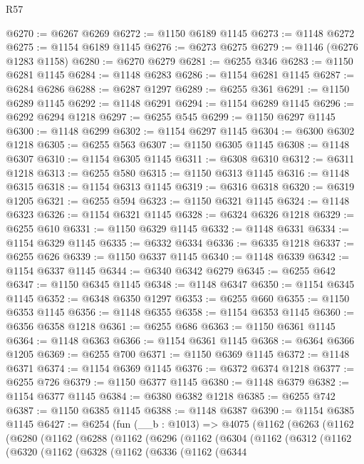 \begin{lexlean}{R57}
\begin{coremodule}
@6270 := @6267 @6269
@6272 := @1150 @6189 @1145
@6273 := @1148 @6272
@6275 := @1154 @6189 @1145
@6276 := @6273 @6275
@6279 := @1146 (@6276 @1283 @1158)
@6280 := @6270 @6279
@6281 := @6255 @346
@6283 := @1150 @6281 @1145
@6284 := @1148 @6283
@6286 := @1154 @6281 @1145
@6287 := @6284 @6286
@6288 := @6287 @1297
@6289 := @6255 @361
@6291 := @1150 @6289 @1145
@6292 := @1148 @6291
@6294 := @1154 @6289 @1145
@6296 := @6292 @6294 @1218
@6297 := @6255 @545
@6299 := @1150 @6297 @1145
@6300 := @1148 @6299
@6302 := @1154 @6297 @1145
@6304 := @6300 @6302 @1218
@6305 := @6255 @563
@6307 := @1150 @6305 @1145
@6308 := @1148 @6307
@6310 := @1154 @6305 @1145
@6311 := @6308 @6310
@6312 := @6311 @1218
@6313 := @6255 @580
@6315 := @1150 @6313 @1145
@6316 := @1148 @6315
@6318 := @1154 @6313 @1145
@6319 := @6316 @6318
@6320 := @6319 @1205
@6321 := @6255 @594
@6323 := @1150 @6321 @1145
@6324 := @1148 @6323
@6326 := @1154 @6321 @1145
@6328 := @6324 @6326 @1218
@6329 := @6255 @610
@6331 := @1150 @6329 @1145
@6332 := @1148 @6331
@6334 := @1154 @6329 @1145
@6335 := @6332 @6334
@6336 := @6335 @1218
@6337 := @6255 @626
@6339 := @1150 @6337 @1145
@6340 := @1148 @6339
@6342 := @1154 @6337 @1145
@6344 := @6340 @6342 @6279
@6345 := @6255 @642
@6347 := @1150 @6345 @1145
@6348 := @1148 @6347
@6350 := @1154 @6345 @1145
@6352 := @6348 @6350 @1297
@6353 := @6255 @660
@6355 := @1150 @6353 @1145
@6356 := @1148 @6355
@6358 := @1154 @6353 @1145
@6360 := @6356 @6358 @1218
@6361 := @6255 @686
@6363 := @1150 @6361 @1145
@6364 := @1148 @6363
@6366 := @1154 @6361 @1145
@6368 := @6364 @6366 @1205
@6369 := @6255 @700
@6371 := @1150 @6369 @1145
@6372 := @1148 @6371
@6374 := @1154 @6369 @1145
@6376 := @6372 @6374 @1218
@6377 := @6255 @726
@6379 := @1150 @6377 @1145
@6380 := @1148 @6379
@6382 := @1154 @6377 @1145
@6384 := @6380 @6382 @1218
@6385 := @6255 @742
@6387 := @1150 @6385 @1145
@6388 := @1148 @6387
@6390 := @1154 @6385 @1145
@6427 := @6254
    (fun (__b : @1013) =>
    @4075
      (@1162
        (@6263
          (@1162
            (@6280
              (@1162
                (@6288
                  (@1162
                    (@6296
                      (@1162
                        (@6304
                          (@1162
                            (@6312
                              (@1162
                                (@6320
                                  (@1162
                                    (@6328
                                      (@1162
                                        (@6336
                                          (@1162
                                            (@6344

\end{coremodule}
\end{lexlean}
